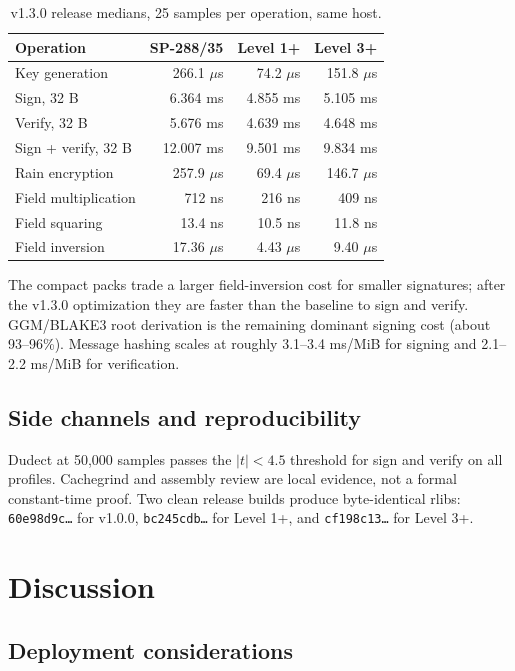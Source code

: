 \documentclass[11pt,a4paper]{article}
\begin{document}
\begin{table}[ht]
\centering
\small
\caption{v1.3.0 release medians, 25 samples per operation, same host.}
\label{tab:perf}
\begin{tabular}{@{}lrrr@{}}
\toprule
Operation & SP-288/35 & Level 1+ & Level 3+ \\
\midrule
Key generation & 266.1 $\mu$s & 74.2 $\mu$s & 151.8 $\mu$s \\
Sign, 32 B & 6.364 ms & 4.855 ms & 5.105 ms \\
Verify, 32 B & 5.676 ms & 4.639 ms & 4.648 ms \\
Sign + verify, 32 B & 12.007 ms & 9.501 ms & 9.834 ms \\
Rain encryption & 257.9 $\mu$s & 69.4 $\mu$s & 146.7 $\mu$s \\
Field multiplication & 712 ns & 216 ns & 409 ns \\
Field squaring & 13.4 ns & 10.5 ns & 11.8 ns \\
Field inversion & 17.36 $\mu$s & 4.43 $\mu$s & 9.40 $\mu$s \\
\bottomrule
\end{tabular}
\end{table}

The compact packs trade a larger field-inversion cost for smaller signatures;
after the v1.3.0 optimization they are faster than the baseline to sign and
verify. GGM/BLAKE3 root derivation is the remaining dominant signing cost
(about 93--96\%). Message hashing scales at roughly 3.1--3.4 ms/MiB for
signing and 2.1--2.2 ms/MiB for verification.

\subsection{Side channels and reproducibility}

Dudect at 50,000 samples passes the $|t|<4.5$ threshold for sign and verify on
all profiles. Cachegrind and assembly review are local evidence, not a formal
constant-time proof. Two clean release builds produce byte-identical rlibs:
\texttt{60e98d9c\ldots} for v1.0.0, \texttt{bc245cdb\ldots} for Level 1+, and
\texttt{cf198c13\ldots} for Level 3+.

\section{Discussion}
\label{sec:discussion}

\subsection{Deployment considerations}
\end{document}

